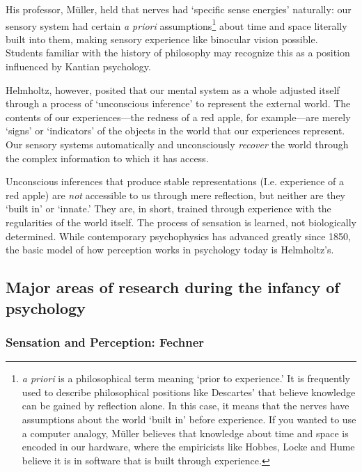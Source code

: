 \begin{refsection}
His professor, Müller, held that nerves had `specific sense energies' naturally: our sensory system had certain \emph{a priori} assumptions\footnote{\emph{a priori} is a philosophical term meaning ‘prior to experience.’ It is frequently used to describe philosophical positions like Descartes’ that believe knowledge can be gained by reflection alone. In this case, it means that the nerves have assumptions about the world ‘built in’ before experience. If you wanted to use a computer analogy, Müller believes that knowledge about time and space is encoded in our hardware, where the empiricists like Hobbes, Locke and Hume believe it is in software that is built through experience.} about time and space literally built into them, making sensory experience like binocular vision possible. Students familiar with the history of philosophy may recognize this as a position influenced by Kantian psychology.

Helmholtz, however, posited that our mental system as a whole adjusted itself through a process of `unconscious inference' to represent the external world. The contents of our experiences---the redness of a red apple, for example---are merely `signs' or `indicators' of the objects in the world that our experiences represent. Our sensory systems automatically and unconsciously \emph{recover} the world through the complex information to which it has access. 

Unconscious inferences that produce stable representations (I.e. experience of a red apple) are \emph{not} accessible to us through mere reflection, but neither are they ‘built in’ or ‘innate.’ They are, in short, trained through experience with the regularities of the world itself. The process of sensation is learned, not biologically determined. While contemporary psychophysics has advanced greatly since 1850, the basic model of how perception works in psychology today is Helmholtz's.

\subsection{Major areas of research during the infancy of psychology}
\label{majorareasofresearchduringtheinfancyofpsychology}

\subsubsection{Sensation and Perception: Fechner}
\label{sensationandperception:fechner}


\end{refsection}
